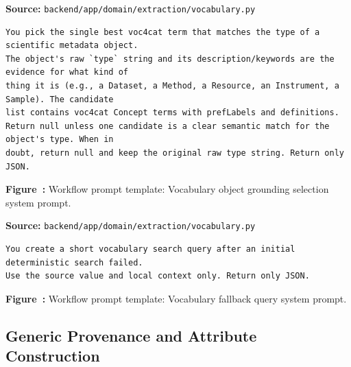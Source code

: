 \noindent\textbf{Source:} \texttt{backend/app/domain/extraction/vocabulary.py}
\begin{lstlisting}[style=workflowPromptListing]
You pick the single best voc4cat term that matches the type of a scientific metadata object.
The object's raw `type` string and its description/keywords are the evidence for what kind of
thing it is (e.g., a Dataset, a Method, a Resource, an Instrument, a Sample). The candidate
list contains voc4cat Concept terms with prefLabels and definitions.
Return null unless one candidate is a clear semantic match for the object's type. When in
doubt, return null and keep the original raw type string. Return only JSON.
\end{lstlisting}
\label{fig:appendix-prompt-vocabulary-object-grounding-selection-system-prompt}
\noindent\textbf{Figure~\thefigure:} Workflow prompt template: Vocabulary object grounding selection system prompt.
\par\medskip

\noindent\textbf{Source:} \texttt{backend/app/domain/extraction/vocabulary.py}
\begin{lstlisting}[style=workflowPromptListing]
You create a short vocabulary search query after an initial deterministic search failed.
Use the source value and local context only. Return only JSON.
\end{lstlisting}
\label{fig:appendix-prompt-vocabulary-fallback-query-system-prompt}
\noindent\textbf{Figure~\thefigure:} Workflow prompt template: Vocabulary fallback query system prompt.
\par\medskip

\subsection*{Generic Provenance and Attribute Construction}

